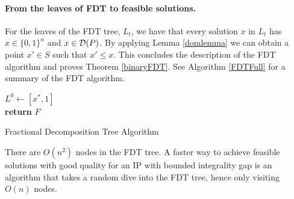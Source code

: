 	\paragraph{From the leaves of FDT to feasible solutions.}
	For the leaves of the FDT tree,  $L_t$, we have that every solution $x$ in $L_t$ has $x\in\{0,1\}^n$ and $x\in \operatorname{\mathcal{D}}(P)$. By applying Lemma \ref{domlemma} we can obtain a point $x'\in S$ such that $x'\leq x$. This concludes the description of the FDT algorithm and proves Theorem \ref{binaryFDT}. See Algorithm \ref{FDTFull} for a summary of the FDT algorithm.
	
	\vspace*{8pt}
	
	
	\begin{algorithm}[H]\label{FDTFull}
		$L^0\leftarrow [x^*,1]$\\
		\textbf{return} $F$
		\caption{Fractional Decomposition Tree Algorithm}
	\end{algorithm}
	
	
\vspace{8pt}
There are $O(n^2)$ nodes in the FDT tree. A faster way to achieve feasible solutions with good quality for an IP with bounded integrality gap is an algorithm that takes a random dive into the FDT tree, hence only visiting $O(n)$ nodes. 

	
	\vspace*{8pt}
	
